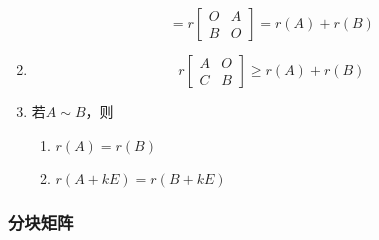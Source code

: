 \documentclass[a4paper,12pt]{article}
\begin{document}
\begin{enumerate}
\[            = r\!\begin{bmatrix}
                     O & A \\
                     B & O
            \end{bmatrix}
            = r(A) + r(B)
        \]
        \item
        \[
            r\!\begin{bmatrix}
                   A & O \\
                   C & B
            \end{bmatrix}
            \ge r(A) + r(B)
        \]
        \item 若$A \sim B$，则
        \begin{enumerate}
            \item $r(A) = r(B)$
            \item $r(A + kE) = r(B + kE)$
        \end{enumerate}
    \end{enumerate}

    \subsubsection{分块矩阵}
\end{document}
